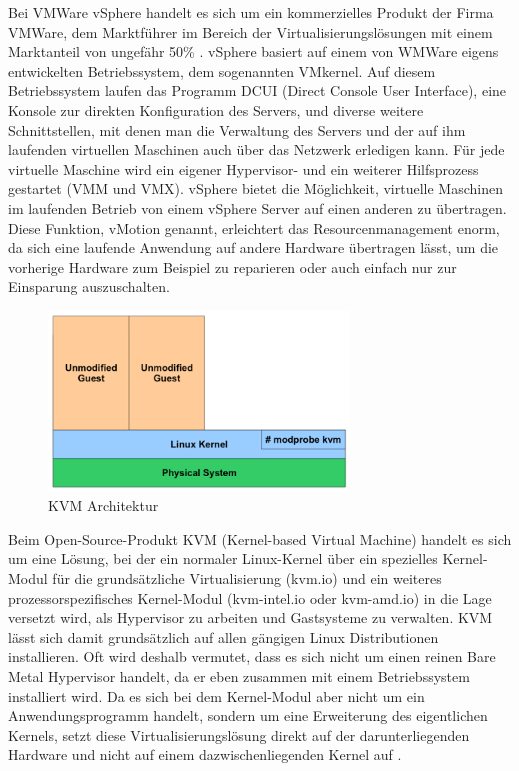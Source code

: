 Bei VMWare vSphere handelt es sich um ein kommerzielles Produkt der Firma VMWare, dem Marktführer im Bereich der Virtualisierungslösungen mit einem Marktanteil von ungefähr 50\% \citep[vgl.][]{vmware:001}. vSphere basiert auf einem von WMWare eigens entwickelten Betriebssystem, dem sogenannten VMkernel. Auf diesem Betriebssystem laufen das Programm DCUI (Direct Console User Interface), eine Konsole zur direkten Konfiguration des Servers, und diverse weitere Schnittstellen, mit denen man die Verwaltung des Servers und der auf ihm laufenden virtuellen Maschinen auch über das Netzwerk erledigen kann. Für jede virtuelle Maschine wird ein eigener Hypervisor- und ein weiterer Hilfsprozess gestartet (VMM und VMX). vSphere bietet die Möglichkeit, virtuelle Maschinen im laufenden Betrieb von einem vSphere Server auf einen anderen zu übertragen. Diese Funktion, vMotion genannt, erleichtert das Resourcenmanagement enorm, da sich eine laufende Anwendung auf andere Hardware übertragen lässt, um die vorherige Hardware zum Beispiel zu reparieren oder auch einfach nur zur Einsparung auszuschalten.

\begin{figure}[!ht]
  \begin{center}
    \includegraphics[width=8cm]{bilder/kvm.png}
    \caption{KVM Architektur \citep{kvm:002}}
  \end{center}
\end{figure}

Beim Open-Source-Produkt KVM (Kernel-based Virtual Machine) handelt es sich um eine Lösung, bei der ein normaler Linux-Kernel über ein spezielles Kernel-Modul für die grundsätzliche Virtualisierung (kvm.io) und ein weiteres prozessorspezifisches Kernel-Modul (kvm-intel.io oder kvm-amd.io) in die Lage versetzt wird, als Hypervisor zu arbeiten und Gastsysteme zu verwalten. KVM lässt sich damit grundsätzlich auf allen gängigen Linux Distributionen installieren. Oft wird deshalb vermutet, dass es sich nicht um einen reinen Bare Metal Hypervisor handelt, da er eben zusammen mit einem Betriebssystem installiert wird. Da es sich bei dem Kernel-Modul aber nicht um ein Anwendungsprogramm handelt, sondern um eine Erweiterung des eigentlichen Kernels, setzt diese Virtualisierungslösung direkt auf der darunterliegenden Hardware und nicht auf einem dazwischenliegenden Kernel auf \citep[Vgl.][S. 225 - 227]{KivKam07}.

